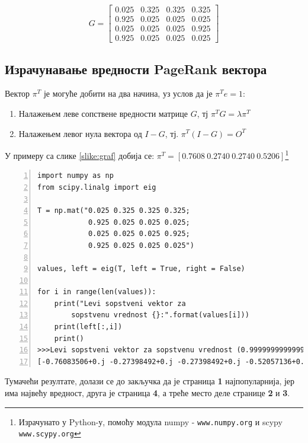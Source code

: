 \[G =
\begin{bmatrix}
0.025 & 0.325 & 0.325 & 0.325 \\
0.925 & 0.025 & 0.025 & 0.025 \\
0.025 & 0.025 & 0.025 & 0.925 \\
0.925 & 0.025 & 0.025 & 0.025
\end{bmatrix}
\]

\subsection{Израчунавање вредности PageRank\texttrademark{} вектора}

Вектор $\pi^{T}$ је могуће добити на два начина, уз услов да је $\pi^{T}e = 1$:

\begin{enumerate}
\item Налажењем леве сопствене вредности матрице $G$, тј $\pi^{T}G=\lambda \pi^{T}$
\item Налажењем левог нула вектора од $I - G$, тј. $\pi^{T}(I-G)=O^{T}$
\end{enumerate}

У примеру са слике \ref{slike:graf} добија се: $\pi^{T} = \left [0.7608\: 0.2740\: 0.2740\: 0.5206 \right ]$\footnote{Израчунато у Python-у, помоћу модула numpy - \texttt{www.numpy.org} и scypy \texttt{www.scypy.org}}

\begin{lstlisting}[caption=Израчунавање леве сопствене вредности, label={lst:eigen}, numbers=left]
import numpy as np
from scipy.linalg import eig

T = np.mat("0.025 0.325 0.325 0.325;
            0.925 0.025 0.025 0.025;
            0.025 0.025 0.025 0.925;
            0.925 0.025 0.025 0.025")

values, left = eig(T, left = True, right = False)

for i in range(len(values)):
	print("Levi sopstveni vektor za 
        sopstvenu vrednost {}:".format(values[i]))
	print(left[:,i])
	print()
>>>Levi sopstveni vektor za sopstvenu vrednost (0.9999999999999998+0j):
[-0.76083506+0.j -0.27398492+0.j -0.27398492+0.j -0.52057136+0.j]
\end{lstlisting}

Тумачећи резултате, долази се до закључка да је страница \textbf{1} најпопуларнија, јер има највећу вредност, друга је страница \textbf{4}, а треће место деле странице \textbf{2} и \textbf{3}.

